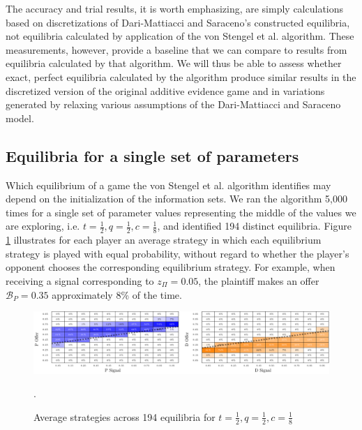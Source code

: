 \documentclass{article}
\begin{document}
The accuracy and trial results, it is worth emphasizing, are simply calculations based on discretizations of Dari-Mattiacci and Saraceno's constructed equilibria, not equilibria calculated by application of the von Stengel et al. algorithm. These measurements, however, provide a baseline that we can compare to results from equilibria calculated by that algorithm. We will thus be able to assess whether exact, perfect equilibria calculated by the algorithm produce similar results in the discretized version of the original additive evidence game and in variations generated by relaxing various assumptions of the Dari-Mattiacci and Saraceno model. 

\subsection{Equilibria for a single set of parameters}

Which equilibrium of a game the von Stengel et al. algorithm identifies may depend on the initialization of the information sets. We ran the algorithm 5,000 times for a single set of parameter values representing the middle of the values we are exploring, i.e. $t=\frac{1}{2}, q=\frac{1}{2}, c=\frac{1}{8}$, and identified 194 distinct equilibria. Figure \ref{fig:multeq} illustrates for each player an average strategy in which each equilibrium strategy is played with equal probability, without regard to whether the player's opponent chooses the corresponding equilibrium strategy. For example, when receiving a signal corresponding to $z_\Pi = 0.05$, the plaintiff makes an offer $\mathcal{B}_P = 0.35$ approximately 8\% of the time. 

\begin{figure}[h!]
\centering
\includegraphics[scale=0.50, trim={0in 0in 0in 0in}, clip]{../Figures/average strategies.pdf}
\caption{Average strategies across 194 equilibria for $t = \frac{1}{2}, q = \frac{1}{2}, c = \frac{1}{8}$}. 
\label{fig:multeq}
\end{figure}
\end{document}
